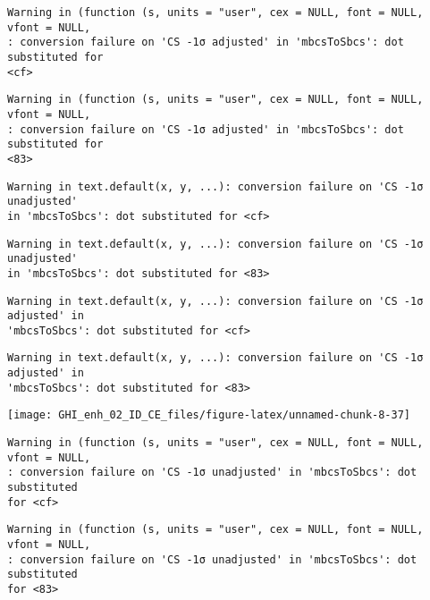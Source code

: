 \documentclass[
  10pt,
  a4paper,oneside]{article}
\begin{document}
\begin{verbatim}
Warning in (function (s, units = "user", cex = NULL, font = NULL, vfont = NULL,
: conversion failure on 'CS -1σ adjusted' in 'mbcsToSbcs': dot substituted for
<cf>
\end{verbatim}

\begin{verbatim}
Warning in (function (s, units = "user", cex = NULL, font = NULL, vfont = NULL,
: conversion failure on 'CS -1σ adjusted' in 'mbcsToSbcs': dot substituted for
<83>
\end{verbatim}

\begin{verbatim}
Warning in text.default(x, y, ...): conversion failure on 'CS -1σ unadjusted'
in 'mbcsToSbcs': dot substituted for <cf>
\end{verbatim}

\begin{verbatim}
Warning in text.default(x, y, ...): conversion failure on 'CS -1σ unadjusted'
in 'mbcsToSbcs': dot substituted for <83>
\end{verbatim}

\begin{verbatim}
Warning in text.default(x, y, ...): conversion failure on 'CS -1σ adjusted' in
'mbcsToSbcs': dot substituted for <cf>
\end{verbatim}

\begin{verbatim}
Warning in text.default(x, y, ...): conversion failure on 'CS -1σ adjusted' in
'mbcsToSbcs': dot substituted for <83>
\end{verbatim}

\begin{center}\texttt{[image: GHI\_enh\_02\_ID\_CE\_files/figure-latex/unnamed-chunk-8-37]} \end{center}

\begin{verbatim}
Warning in (function (s, units = "user", cex = NULL, font = NULL, vfont = NULL,
: conversion failure on 'CS -1σ unadjusted' in 'mbcsToSbcs': dot substituted
for <cf>
\end{verbatim}

\begin{verbatim}
Warning in (function (s, units = "user", cex = NULL, font = NULL, vfont = NULL,
: conversion failure on 'CS -1σ unadjusted' in 'mbcsToSbcs': dot substituted
for <83>
\end{verbatim}
\end{document}
